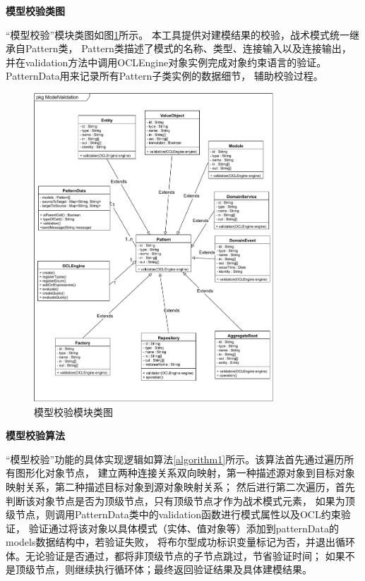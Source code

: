 \newpage
\textbf{模型校验类图}

“模型校验”模块类图如图\ref{classValidation}所示。
本工具提供对建模结果的校验，战术模式统一继承自Pattern类，
Pattern类描述了模式的名称、类型、连接输入以及连接输出，
并在validation方法中调用OCLEngine对象实例完成对象约束语言的验证。
PatternData用来记录所有Pattern子类实例的数据细节，
辅助校验过程。


\begin{figure}[!htbp] %
    \centering %
    \includegraphics[width=0.8\textwidth]{FIGs/chapter4/classValidation.pdf} %
    \caption{模型校验模块类图} %
    \label{classValidation} %
\end{figure}%

\textbf{模型校验算法}

“模型校验”功能的具体实现逻辑如算法\ref{algorithm1}所示。该算法首先通过遍历所有图形化对象节点，
建立两种连接关系双向映射，第一种描述源对象到目标对象映射关系，第二种描述目标对象到源对象映射关系；
然后进行第二次遍历，首先判断该对象节点是否为顶级节点，只有顶级节点才作为战术模式元素，
如果为顶级节点，则调用PatternData类中的validation函数进行模式属性以及OCL约束验证，
验证通过将该对象以具体模式（实体、值对象等）添加到patternData的models数据结构中，若验证失败，
将布尔型成功标识变量标记为否，并退出循环体。无论验证是否通过，都将非顶级节点的子节点跳过，节省验证时间；
如果不是顶级节点，则继续执行循环体；最终返回验证结果及具体建模结果。


